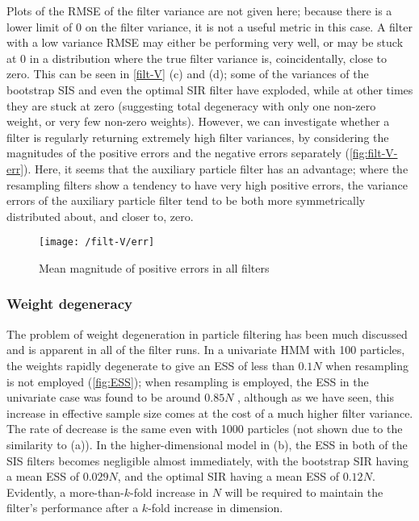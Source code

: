 \documentclass[10pt,fleqn]{article}
\begin{document}
Plots of the RMSE of the filter variance are not given here; because there is a lower limit of 0 on the filter variance, it is not a useful metric in this case. A filter with a low variance RMSE may either be performing very well, or may be stuck at 0 in a distribution where the true filter variance is, coincidentally, close to zero. This can be seen in \autoref{filt-V} (c) and (d); some of the variances of the bootstrap SIS and even the optimal SIR filter have exploded, while at other times they are stuck at zero (suggesting total degeneracy with only one non-zero weight, or very few non-zero weights). However, we can investigate whether a filter is regularly returning extremely high filter variances, by considering the magnitudes of the positive errors and the negative errors separately (\autoref{fig:filt-V-err}). Here, it seems that the auxiliary particle filter has an advantage; where the resampling filters show a tendency to have very high positive errors, the variance errors of the auxiliary particle filter tend to be both more symmetrically distributed about, and closer to, zero.

\begin{figure}[H]		%
\caption{Mean magnitude of positive errors in all filters}
\label{fig:filt-V-err}
	\centering
	\texttt{[image: /filt-V/err]}

\end{figure}

\subsubsection{Weight degeneracy}
The problem of weight degeneration in particle filtering has been much discussed and is apparent in all of the filter runs. In a univariate HMM with 100 particles, the weights rapidly degenerate to give an ESS of less than $0.1N$ when resampling is not employed (\autoref{fig:ESS}); when resampling is employed, the ESS in the univariate case was found to be around $0.85N$ , although as we have seen, this increase in effective sample size comes at the cost of a much higher filter variance. The rate of decrease is the same even with 1000 particles (not shown due to the similarity to (a)). In the higher-dimensional model in (b), the ESS in both of the SIS filters becomes negligible almost immediately, with the bootstrap SIR having a mean ESS of $0.029N$, and the optimal SIR having a mean ESS of $0.12N$. Evidently, a more-than-$k$-fold increase in $N$ will be required to maintain the filter's performance after a $k$-fold increase in dimension.
\end{document}
